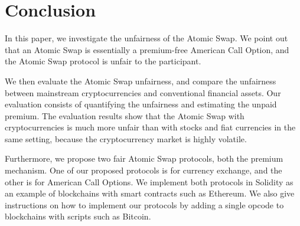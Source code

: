 \section{Conclusion}
\label{sec:conclusion}


In this paper, we investigate the unfairness of the Atomic Swap.
We point out that an Atomic Swap is essentially a premium-free American Call Option,
and the Atomic Swap protocol is unfair to the participant.

We then evaluate the Atomic Swap unfairness, and compare the unfairness between mainstream cryptocurrencies and conventional financial assets.
Our evaluation consists of quantifying the unfairness and estimating the unpaid premium.
The evaluation results show that the Atomic Swap with cryptocurrencies is much more unfair than with stocks and fiat currencies in the same setting, because the cryptocurrency market is highly volatile.

Furthermore, we propose two fair Atomic Swap protocols, both  the premium mechanism.
One of our proposed protocols is for currency exchange, and the other is for American Call Options.
We implement both protocols in Solidity as an example of blockchains with smart contracts such as Ethereum.
We also give instructions on how to implement our protocols by adding a single opcode to blockchains with scripts such as Bitcoin.